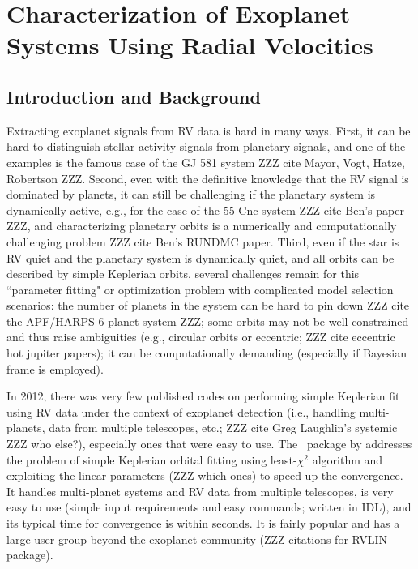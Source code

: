 \chapter{Characterization of Exoplanet Systems Using Radial
  Velocities}


\section{Introduction and Background}

Extracting exoplanet signals from RV data is hard in many ways. First,
it can be hard to distinguish stellar activity signals from planetary
signals, and one of the examples is the famous case of the GJ 581
system ZZZ cite Mayor, Vogt, Hatze, Robertson ZZZ. Second, even with
the definitive knowledge that the RV signal is dominated by planets,
it can still be challenging if the planetary system is dynamically
active, e.g., for the case of the 55 Cnc system ZZZ cite Ben's paper
ZZZ, and characterizing planetary orbits is a numerically and
computationally challenging problem ZZZ cite Ben's RUNDMC
paper. Third, even if the star is RV quiet and the planetary system is
dynamically quiet, and all orbits can be described by simple Keplerian
orbits, several challenges remain for this ``parameter fitting" or
optimization problem with complicated model selection scenarios: the
number of planets in the system can be hard to pin down ZZZ cite the
APF/HARPS 6 planet system ZZZ; some orbits may not be well constrained
and thus raise ambiguities (e.g., circular orbits or eccentric; ZZZ
cite eccentric hot jupiter papers); it can be computationally
demanding (especially if Bayesian frame is employed).

In 2012, there was very few published codes on performing simple
Keplerian fit using RV data under the context of exoplanet detection
(i.e., handling multi-planets, data from multiple telescopes, etc.;
ZZZ cite Greg Laughlin's systemic ZZZ who else?), especially ones that
were easy to use. The \rvlin\ package by \cite{rvlin} addresses
the problem of simple Keplerian orbital fitting using least-$\chi^2$
algorithm and exploiting the linear parameters (ZZZ which ones) to
speed up the convergence. It handles multi-planet systems and RV data
from multiple telescopes, is very easy to use (simple input
requirements and easy commands; written in IDL), and its typical time
for convergence is within seconds. It is fairly popular and has a
large user group beyond the exoplanet community (ZZZ citations for
RVLIN package).

